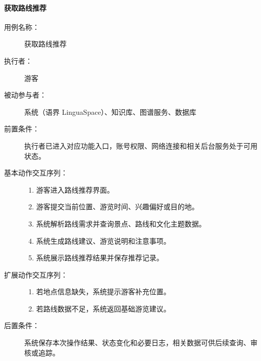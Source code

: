 \paragraph{获取路线推荐}
\begin{description}
  \item[用例名称：] 获取路线推荐
  \item[执行者：] 游客
  \item[被动参与者：] 系统（语界 LinguaSpace）、知识库、图谱服务、数据库
  \item[前置条件：] 执行者已进入对应功能入口，账号权限、网络连接和相关后台服务处于可用状态。
  \item[基本动作交互序列：]
  \begin{enumerate}
    \item 游客进入路线推荐界面。
    \item 游客提交当前位置、游览时间、兴趣偏好或目的地。
    \item 系统解析路线需求并查询景点、路线和文化主题数据。
    \item 系统生成路线建议、游览说明和注意事项。
    \item 系统展示路线推荐结果并保存推荐记录。
  \end{enumerate}
  \item[扩展动作交互序列：]
  \begin{enumerate}
    \item[2a.] 若地点信息缺失，系统提示游客补充位置。
    \item[3a.] 若路线数据不足，系统返回基础游览建议。
  \end{enumerate}
  \item[后置条件：] 系统保存本次操作结果、状态变化和必要日志，相关数据可供后续查询、审核或追踪。
\end{description}

